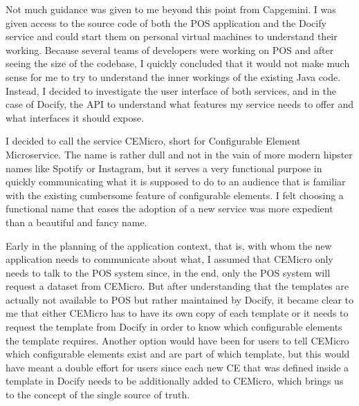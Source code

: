 Not much guidance was given to me beyond this point from Capgemini. I was given access to the source code of both the POS application and the Docify service and could start them on personal virtual machines to understand their working. Because several teams of developers were working on POS and after seeing the size of the codebase, I quickly concluded that it would not make much sense for me to try to understand the inner workings of the existing Java code. Instead, I decided to investigate the user interface of both services, and in the case of Docify, the API to understand what features my service needs to offer and what interfaces it should expose.

I decided to call the service CEMicro, short for Configurable Element Microservice. The name is rather dull and not in the vain of more modern hipster names like Spotify or Instagram, but it serves a very functional purpose in quickly communicating what it is supposed to do to an audience that is familiar with the existing cumbersome feature of configurable elements. I felt choosing a functional name that eases the adoption of a new service was more expedient than a beautiful and fancy name.

Early in the planning of the application context, that is, with whom the new application needs to communicate about what, I assumed that CEMicro only needs to talk to the POS system since, in the end, only the POS system will request a dataset from CEMicro. But after understanding that the templates are actually not available to POS but rather maintained by Docify, it became clear to me that either CEMicro has to have its own copy of each template or it needs to request the template from Docify in order to know which configurable elements the template requires. Another option would have been for users to tell CEMicro which configurable elements exist and are part of which template, but this would have meant a double effort for users since each new CE that was defined inside a template in Docify needs to be additionally added to CEMicro, which brings us to the concept of the single source of truth.

